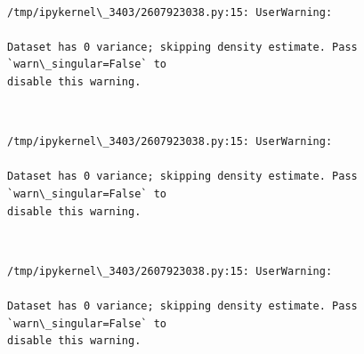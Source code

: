 \documentclass[11pt]{article}
\begin{document}
    \begin{center}
    \end{center}
    { \hspace*{\fill} \\}
    
    \begin{Verbatim}[commandchars=\\\{\}]
/tmp/ipykernel\_3403/2607923038.py:15: UserWarning:

Dataset has 0 variance; skipping density estimate. Pass `warn\_singular=False` to
disable this warning.

    \end{Verbatim}

    \begin{center}
    \end{center}
    { \hspace*{\fill} \\}
    
    \begin{Verbatim}[commandchars=\\\{\}]
/tmp/ipykernel\_3403/2607923038.py:15: UserWarning:

Dataset has 0 variance; skipping density estimate. Pass `warn\_singular=False` to
disable this warning.

    \end{Verbatim}

    \begin{center}
    \end{center}
    { \hspace*{\fill} \\}
    
    \begin{Verbatim}[commandchars=\\\{\}]
/tmp/ipykernel\_3403/2607923038.py:15: UserWarning:

Dataset has 0 variance; skipping density estimate. Pass `warn\_singular=False` to
disable this warning.

    \end{Verbatim}

    \begin{center}
    \end{center}
    { \hspace*{\fill} \\}
    
\end{document}
